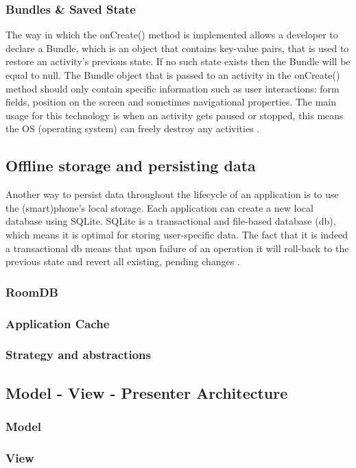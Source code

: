 \subsubsection{Bundles \& Saved State}
The way in which the onCreate() method is implemented allows a developer to declare a Bundle, which is an object that contains key-value pairs, that is used to restore an activity's previous state. If no such state exists then the Bundle will be equal to null. The Bundle object that is passed to an activity in the onCreate() method should only contain specific information such as user interactions: form fields, position on the screen and sometimes navigational properties. The main usage for this technology is when an activity gets paused or stopped, this means the OS (operating system) can freely destroy any activities \cite{JamesHalpern2012}.
\subsection{Offline storage and persisting data}
Another way to persist data throughout the lifecycle of an application is to use the (smart)phone's local storage. Each application can create a new local database using SQLite. SQLite is a transactional and file-based database (db), which means it is optimal for storing user-specific data. The fact that it is indeed a transactional db means that upon failure of an operation it will roll-back to the previous state and revert all existing, pending changes \cite{TutorialsPoint2019}.
\subsubsection{RoomDB}
\subsubsection{Application Cache}
\subsubsection{Strategy and abstractions}
\subsection{Model - View - Presenter Architecture}
\subsubsection{Model}
\subsubsection{View}
